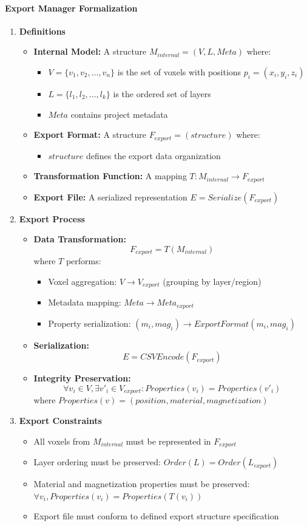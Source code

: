 \documentclass[12pt, titlepage]{article}
\begin{document}
\iffalse
\paragraph{Export Manager Formalization}
\begin{enumerate}
\item \textbf{Definitions}
\begin{itemize}
\item \textbf{Internal Model:} A structure $M_{internal} = (V, L, Meta)$ where:
\begin{itemize}
\item $V = \{v_1, v_2, \ldots, v_n\}$ is the set of voxels with positions $p_i = (x_i, y_i, z_i)$
\item $L = \{l_1, l_2, \ldots, l_k\}$ is the ordered set of layers
\item $Meta$ contains project metadata
\end{itemize}
\item \textbf{Export Format:} A structure $F_{export} = (structure)$ where:
\begin{itemize}
\item $structure$ defines the export data organization
\end{itemize}
\item \textbf{Transformation Function:} A mapping $T : M_{internal} \rightarrow F_{export}$
\item \textbf{Export File:} A serialized representation $E = Serialize(F_{export})$
\end{itemize}
\item \textbf{Export Process}
\begin{itemize}
\item \textbf{Data Transformation:}
$$F_{export} = T(M_{internal})$$
where $T$ performs:
\begin{itemize}
\item Voxel aggregation: $V \rightarrow V_{export}$ (grouping by layer/region)
\item Metadata mapping: $Meta \rightarrow Meta_{export}$
\item Property serialization: $(m_i, mag_i) \rightarrow ExportFormat(m_i, mag_i)$
\end{itemize}
\item \textbf{Serialization:}
$$E = CSVEncode(F_{export})$$
\item \textbf{Integrity Preservation:}
$$\forall v_i \in V, \exists v'_i \in V_{export} : Properties(v_i) = Properties(v'_i)$$
where $Properties(v) = (position, material, magnetization)$
\end{itemize}
\item \textbf{Export Constraints}
\begin{itemize}
\item All voxels from $M_{internal}$ must be represented in $F_{export}$
\item Layer ordering must be preserved: $Order(L) = Order(L_{export})$
\item Material and magnetization properties must be preserved: $\forall v_i, Properties(v_i) = Properties(T(v_i))$
\item Export file must conform to defined export structure specification
\end{itemize}
\end{enumerate}
\end{document}
